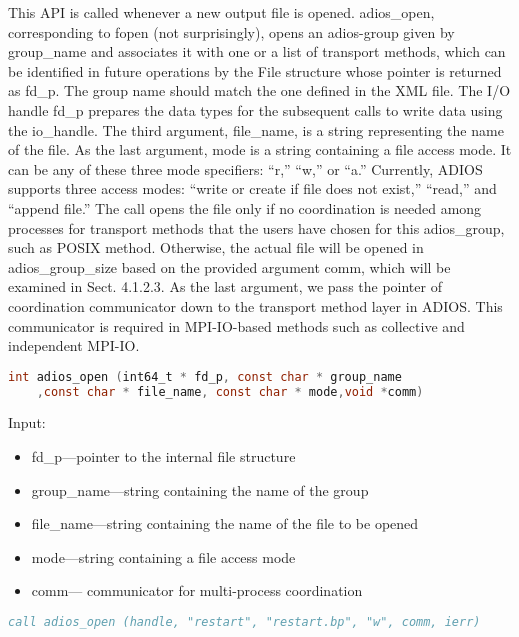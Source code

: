This API is called whenever a new output file is opened. adios\_open, corresponding 
to fopen (not surprisingly), opens an adios-group given by group\_name\textit{ 
}and associates it with one or a list of transport methods, which can be identified 
in future operations by the File structure whose pointer is returned as\textit{ 
}fd\_p. The group name should match the one defined in the XML file. The I/O handle 
fd\_p prepares the data types for the subsequent calls to write data using the 
io\_handle. The third argument, file\_name, is a string representing the name of 
the file. As the last argument, mode is a string containing a file access mode. 
It can be any of these three mode specifiers: ``r,'' ``w,'' or ``a.'' Currently, 
ADIOS supports three access modes: ``write or create if file does not exist,'' 
``read,'' and ``append file.'' The call opens the file only if no coordination 
is needed among processes for transport methods that the users have chosen for 
this adios\_group, such as POSIX method. Otherwise, the actual file will be opened 
in adios\_group\_size based on the provided argument comm, which will be examined 
in Sect. 4.1.2.3. As the last argument, we pass the pointer of coordination communicator 
down to the transport method layer in ADIOS. This communicator is required in MPI-IO-based 
methods such as collective and independent MPI-IO.

\begin{lstlisting}[language=C]
int adios_open (int64_t * fd_p, const char * group_name 
	,const char * file_name, const char * mode,void *comm)
\end{lstlisting}

Input: 
\begin{itemize}
\item fd\_p---pointer to the internal file structure
\item group\_name---string containing the name of the group 
\item file\_name---string containing the name of the file to be opened 
\item mode---string containing  a file access mode
\item comm--- communicator for multi-process coordination
\end{itemize}

\begin{lstlisting}[language=Fortran]
call adios_open (handle, "restart", "restart.bp", "w", comm, ierr)
\end{lstlisting}

